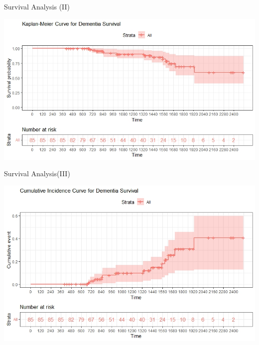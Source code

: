 \documentclass{beamer}
\begin{document}
	\begin{frame}{Survival Analysis (II)}
	
		\begin{center}
			\includegraphics[width=\columnwidth]{kaplan-meier_bello.jpeg}
		\end{center}
	\end{frame}

	\begin{frame}{Survival Analysis(III)}
	
		\begin{center}
			\includegraphics[width=0.95\columnwidth]{cumulative.jpeg}
		\end{center}
	\end{frame}
\end{document}
